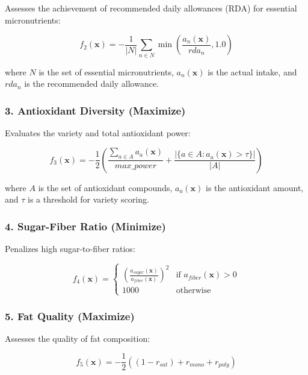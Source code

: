 \documentclass[12pt,a4paper]{article}
\begin{document}
Assesses the achievement of recommended daily allowances (RDA) for essential micronutrients:

\begin{equation}
f_2(\mathbf{x}) = -\frac{1}{|N|} \sum_{n \in N} \min\left(\frac{a_n(\mathbf{x})}{rda_n}, 1.0\right)
\end{equation}

where $N$ is the set of essential micronutrients, $a_n(\mathbf{x})$ is the actual intake, and $rda_n$ is the recommended daily allowance.

\subsubsection{3. Antioxidant Diversity (Maximize)}

Evaluates the variety and total antioxidant power:

\begin{equation}
f_3(\mathbf{x}) = -\frac{1}{2}\left(\frac{\sum_{a \in A} a_a(\mathbf{x})}{max\_power} + \frac{|\{a \in A : a_a(\mathbf{x}) > \tau\}|}{|A|}\right)
\end{equation}

where $A$ is the set of antioxidant compounds, $a_a(\mathbf{x})$ is the antioxidant amount, and $\tau$ is a threshold for variety scoring.

\subsubsection{4. Sugar-Fiber Ratio (Minimize)}

Penalizes high sugar-to-fiber ratios:

\begin{equation}
f_4(\mathbf{x}) = \begin{cases}
\left(\frac{a_{sugar}(\mathbf{x})}{a_{fiber}(\mathbf{x})}\right)^2 & \text{if } a_{fiber}(\mathbf{x}) > 0 \\
1000 & \text{otherwise}
\end{cases}
\end{equation}

\subsubsection{5. Fat Quality (Maximize)}

Assesses the quality of fat composition:

\begin{equation}
f_5(\mathbf{x}) = -\frac{1}{2}\left((1 - r_{sat}) + r_{mono} + r_{poly}\right)
\end{equation}
\end{document}

